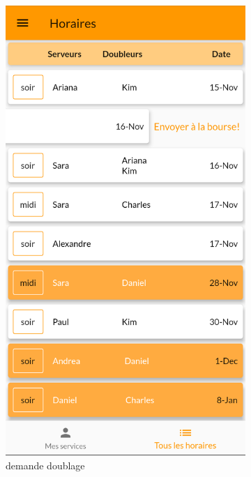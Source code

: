         \begin{figure}[!h]
            \centering
            \begin{subfigure}{.3\textwidth}
                \centering
                \includegraphics[width=0.9\linewidth]{screenshots/scenario_07/horaire_doublage.png}
                \caption{demande doublage}
                \label{fig:ask_doublage}
            \end{subfigure}
            \begin{subfigure}{.3\textwidth}
                \centering

\end{subfigure}
\end{figure}
